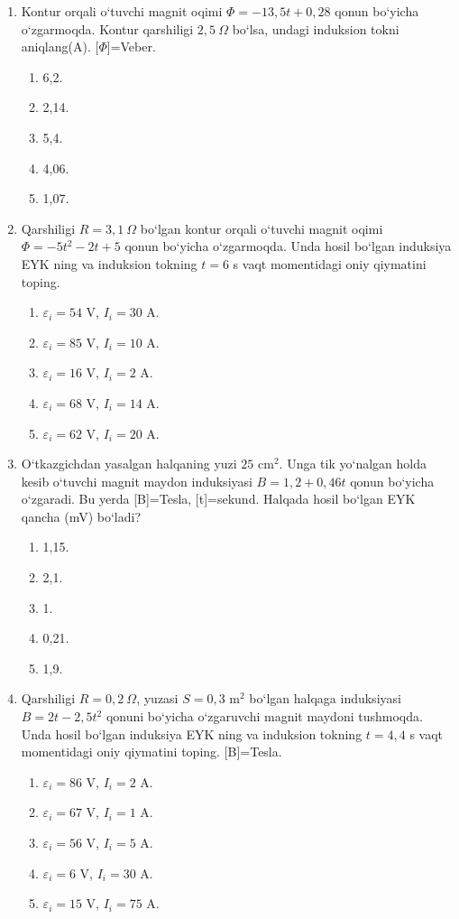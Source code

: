 \begin{enumerate}
\item Kontur orqali o‘tuvchi magnit oqimi $\Phi=-13,5t+0,28$ qonun bo‘yicha o‘zgarmoqda. Kontur qarshiligi $2,5~\Omega$ bo‘lsa, undagi induksion tokni aniqlang(A). [$\Phi$]=Veber.
\begin{enumerate}[label=\Alph*)]
\item 6,2.
\item 2,14.
\item 5,4.
\item 4,06.
\item 1,07.
\end{enumerate}

\item Qarshiligi $R=3,1~\Omega$ bo‘lgan kontur orqali o‘tuvchi magnit oqimi $\Phi=-5t^2-2t+5$ qonun bo‘yicha o‘zgarmoqda. Unda hosil bo‘lgan induksiya EYK ning va induksion tokning $t=6$ s vaqt momentidagi oniy qiymatini toping.
\begin{enumerate}[label=\Alph*)]
\item $\varepsilon_i=54$ V, $I_i=30$ A.
\item $\varepsilon_i=85$ V, $I_i=10$ A.
\item $\varepsilon_i=16$ V, $I_i=2$ A.
\item $\varepsilon_i=68$ V, $I_i=14$ A.
\item $\varepsilon_i=62$ V, $I_i=20$ A.
\end{enumerate}

\item O‘tkazgichdan yasalgan halqaning yuzi $25$ cm$^2$. Unga tik yo‘nalgan holda kesib o‘tuvchi magnit maydon induksiyasi $B=1,2+0,46t$ qonun bo‘yicha o‘zgaradi. Bu yerda [B]=Tesla, [t]=sekund. Halqada hosil bo‘lgan EYK qancha (mV) bo‘ladi?
\begin{enumerate}[label=\Alph*)]
\item 1,15.
\item 2,1.
\item 1.
\item 0,21.
\item 1,9.
\end{enumerate}

\item Qarshiligi $R=0,2~\Omega$, yuzasi $S=0,3$ m$^2$ bo‘lgan halqaga induksiyasi $B=2t-2,5t^2$ qonuni bo‘yicha o‘zgaruvchi magnit maydoni tushmoqda. Unda hosil bo‘lgan induksiya EYK ning va induksion tokning $t=4,4$ s vaqt momentidagi oniy qiymatini toping. [B]=Tesla.
\begin{enumerate}[label=\Alph*)]
\item $\varepsilon_i=86$ V, $I_i=2$ A.
\item $\varepsilon_i=67$ V, $I_i=1$ A.
\item $\varepsilon_i=56$ V, $I_i=5$ A.
\item $\varepsilon_i=6$ V, $I_i=30$ A.
\item $\varepsilon_i=15$ V, $I_i=75$ A.
\end{enumerate}


\end{enumerate}
